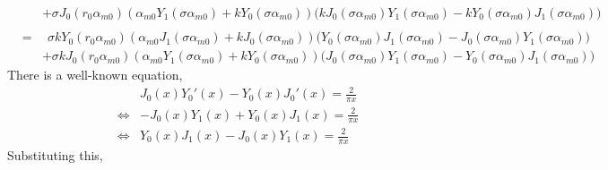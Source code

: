 \documentclass{article}
\begin{document}
\begin{eqnarray}
    & & + \sigma J_0(r_0\alpha_{m0})
          (\alpha_{m0}Y_1(\sigma\alpha_{m0}) + kY_0(\sigma\alpha_{m0}))
          \Big(
          kJ_0(\sigma\alpha_{m0})Y_1(\sigma\alpha_{m0}) -
          kY_0(\sigma\alpha_{m0})J_1(\sigma\alpha_{m0})
          \Big)\nonumber\\
\nonumber\\
    &=&   \ \ \sigma kY_0(r_0\alpha_{m0})
          (\alpha_{m0}J_1(\sigma\alpha_{m0}) + kJ_0(\sigma\alpha_{m0}))
          \Big(
          Y_0(\sigma\alpha_{m0})J_1(\sigma\alpha_{m0}) -
          J_0(\sigma\alpha_{m0})Y_1(\sigma\alpha_{m0})
          \Big) \nonumber\\
    & & + \sigma kJ_0(r_0\alpha_{m0})
          (\alpha_{m0}Y_1(\sigma\alpha_{m0}) + kY_0(\sigma\alpha_{m0}))
          \Big(
          J_0(\sigma\alpha_{m0})Y_1(\sigma\alpha_{m0}) -
          Y_0(\sigma\alpha_{m0})J_1(\sigma\alpha_{m0})
          \Big)\nonumber
\end{eqnarray}
%
There is a well-known equation,
%
\begin{eqnarray}
    & &                J_0(x)Y_0'(x) - Y_0(x)J_0'(x) = \frac{2}{\pi x} \nonumber\\
    &\Leftrightarrow& -J_0(x)Y_1 (x) + Y_0(x)J_1 (x) = \frac{2}{\pi x} \nonumber\\
    &\Leftrightarrow&  Y_0(x)J_1 (x) - J_0(x)Y_1 (x) = \frac{2}{\pi x} \nonumber
\end{eqnarray}
%
Substituting this,
%
\end{document}
